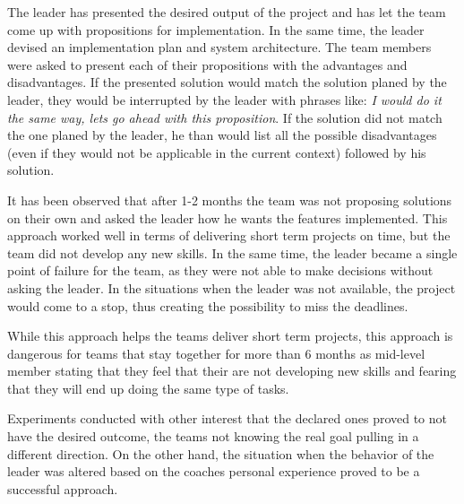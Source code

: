 The leader has presented the desired output of the project and has let the team come up with propositions for implementation. In the same time, the leader devised an implementation plan and system architecture. The team members were asked to present each of their propositions with the advantages and disadvantages. If the presented solution would match the solution planed by the leader, they would be interrupted by the leader with phrases like: \textit{I would do it the same way, lets go ahead with this proposition}. If the solution did not match the one planed by the leader, he than would list all the possible disadvantages (even if they would not be applicable in the current context) followed by his solution.

It has been observed that after 1-2 months the team was not proposing solutions on their own and asked the leader how he wants the features implemented. This approach worked well in terms of delivering short term projects on time, but the team did not develop any new skills. In the same time, the leader became a single point of failure for the team, as they were not able to make decisions without asking the leader. In the situations when the leader was not available, the project would come to a stop, thus creating the possibility to miss the deadlines.

While this approach helps the teams deliver short term projects, this approach is dangerous for teams that stay together for more than 6 months as mid-level member stating that they feel that their are not developing new skills and fearing that they will end up doing the same type of tasks. 

Experiments conducted with other interest that the declared ones proved to not have the desired outcome, the teams not knowing the real goal pulling in a different direction. On the other hand, the situation when the behavior of the leader was altered based on the coaches personal experience proved to be a successful approach.